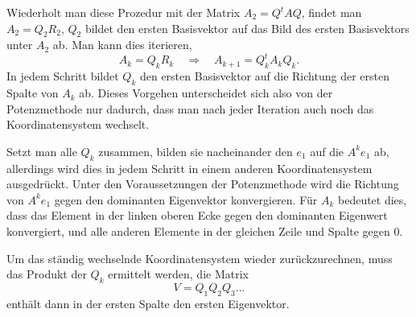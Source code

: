 Wiederholt man diese Prozedur mit
der Matrix $A_2=Q^tAQ$, findet man $A_2=Q_2R_2$, 
$Q_2$  bildet den ersten Basisvektor auf das Bild  des ersten
Basisvektors unter $A_2$ ab.
Man kann dies iterieren,
\[
A_k=Q_kR_k\quad\Rightarrow\quad
A_{k+1}=Q_k^tA_kQ_k.
\]
In jedem Schritt bildet $Q_k$ den ersten Basisvektor auf die Richtung
der ersten Spalte von $A_k$ ab.
Dieses Vorgehen unterscheidet sich
also von der Potenzmethode nur dadurch, dass man nach jeder Iteration
auch noch das Koordinatensystem wechselt.

Setzt man alle $Q_k$ zusammen, bilden
sie nacheinander den $e_1$ auf die $A^ke_1$ ab, allerdings wird
dies in jedem Schritt in einem anderen Koordinatensystem ausgedrückt.
Unter den Voraussetzungen der Potenzmethode wird die Richtung von
$A^ke_1$ gegen den dominanten Eigenvektor konvergieren.
Für $A_k$ bedeutet dies,
dass das Element in der linken oberen Ecke gegen den dominanten Eigenwert
konvergiert, und alle anderen Elemente in der gleichen Zeile und Spalte
gegen $0$.

Um das ständig wechselnde Koordinatensystem wieder zurückzurechnen,
muss das Produkt der $Q_k$ ermittelt werden,  die Matrix
\[
V=Q_1Q_2Q_3\dots
\]
enthält dann in der ersten Spalte den ersten Eigenvektor.

